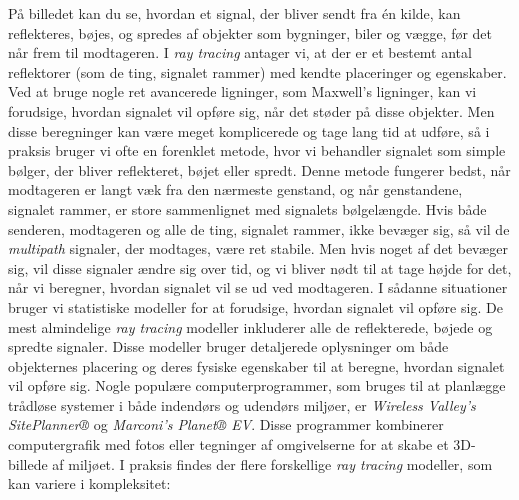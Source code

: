 \documentclass[a4paper,12pt]{book}
\begin{document}
	\noindent
	På billedet kan du se, hvordan et signal, der bliver sendt fra én kilde, kan reflekteres, bøjes, og spredes af objekter som bygninger, biler og vægge, før det når frem til modtageren.
	\newline\newline\noindent
	I \textit{ray tracing} antager vi, at der er et bestemt antal reflektorer (som de ting, signalet rammer) med kendte placeringer og egenskaber. Ved at bruge nogle ret avancerede ligninger, som Maxwell's ligninger, kan vi forudsige, hvordan signalet vil opføre sig, når det støder på disse objekter. Men disse beregninger kan være meget komplicerede og tage lang tid at udføre, så i praksis bruger vi ofte en forenklet metode, hvor vi behandler signalet som simple bølger, der bliver reflekteret, bøjet eller spredt.
	\newline\newline\noindent
	Denne metode fungerer bedst, når modtageren er langt væk fra den nærmeste genstand, og når genstandene, signalet rammer, er store sammenlignet med signalets bølgelængde.
	\newline\newline\noindent
	Hvis både senderen, modtageren og alle de ting, signalet rammer, ikke bevæger sig, så vil de \textit{multipath} signaler, der modtages, være ret stabile. Men hvis noget af det bevæger sig, vil disse signaler ændre sig over tid, og vi bliver nødt til at tage højde for det, når vi beregner, hvordan signalet vil se ud ved modtageren. I sådanne situationer bruger vi statistiske modeller for at forudsige, hvordan signalet vil opføre sig.
	\newline\newline\noindent
	De mest almindelige \textit{ray tracing} modeller inkluderer alle de reflekterede, bøjede og spredte signaler. Disse modeller bruger detaljerede oplysninger om både objekternes placering og deres fysiske egenskaber til at beregne, hvordan signalet vil opføre sig.
	\newline\newline\noindent
	Nogle populære computerprogrammer, som bruges til at planlægge trådløse systemer i både indendørs og udendørs miljøer, er \textit{Wireless Valley's SitePlanner®} og \textit{Marconi's Planet® EV}. Disse programmer kombinerer computergrafik med fotos eller tegninger af omgivelserne for at skabe et 3D-billede af miljøet.
	\newline\newline\noindent
	I praksis findes der flere forskellige \textit{ray tracing} modeller, som kan variere i kompleksitet:
\end{document}
